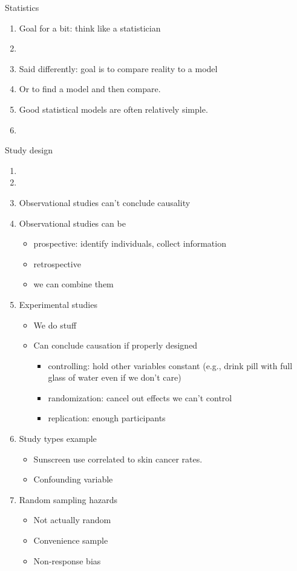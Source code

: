 Statistics
\begin{enumerate}
\item Goal for a bit: think like a statistician
\item {}
\item Said differently: goal is to compare reality to a model
\item Or to find a model and then compare.
\item Good statistical models are often relatively simple.
\item {}
\end{enumerate}

Study design
\begin{enumerate}
\item {}
\item {}
\item Observational studies can't conclude causality
\item Observational studies can be
  \begin{itemize}
  \item prospective: identify individuals, collect information
  \item retrospective
  \item we can combine them
  \end{itemize}
\item Experimental studies
  \begin{itemize}
  \item We do stuff
  \item Can conclude causation if properly designed
    \begin{itemize}
    \item controlling: hold other variables constant (e.g., drink pill
      with full glass of water even if we don't care)
    \item randomization: cancel out effects we can't control
    \item replication: enough participants
    \end{itemize}
  \end{itemize}
\item Study types example
  \begin{itemize}
  \item Sunscreen use correlated to skin cancer rates.
  \item Confounding variable
  \end{itemize}
\item Random sampling hazards
  \begin{itemize}
  \item Not actually random
  \item Convenience sample
  \item Non-response bias
  \end{itemize}
\end{enumerate}

